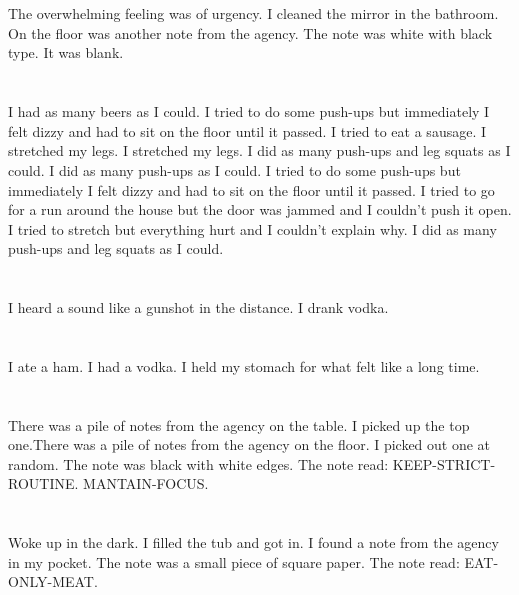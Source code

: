 \documentclass{article}
\begin{document}
    \section{}
    The overwhelming feeling was of urgency. I cleaned the mirror in the bathroom. On the floor was another note from the agency. The note was white with black type. It was blank.  
    \newpage
    
    \section{}
    I had as many beers as I could. I tried to do some push-ups but immediately I felt dizzy and had to sit on the floor until it passed. I tried to eat a sausage.  I stretched my legs.  I stretched my legs.  I did as many push-ups and leg squats as I could.  I did as many push-ups as I could.   I tried to do some push-ups but immediately I felt dizzy and had to sit on the floor until it passed.  I tried to go for a run around the house but the door was jammed and I couldn't push it open.  I tried to stretch but everything hurt and I couldn't explain why.  I did as many push-ups and leg squats as I could.  
    \newpage
    
    \section{}
    I heard a sound like a gunshot in the distance. I drank vodka.  
    \newpage
    
    \section{}
    I ate a ham. I had a vodka. I held my stomach for what felt like a long time.  
    \newpage
    
    \section{}
    There was a pile of notes from the agency on the table. I picked up the top one.There was a pile of notes from the agency on the floor. I picked out one at random. The note was black with white edges. The note read: KEEP-STRICT-ROUTINE. MANTAIN-FOCUS.  
    \newpage
    
    \section{}
    Woke up in the dark. I filled the tub and got in. I found a note from the agency in my pocket. The note was a small piece of square paper. The note read: EAT-ONLY-MEAT.  
    \newpage
    
\end{document}
